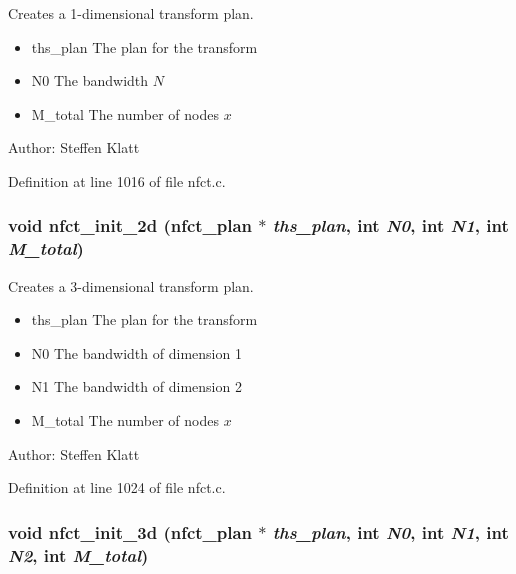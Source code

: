 Creates a 1-dimensional transform plan. 

\begin{itemize}
\item ths\_\-plan The plan for the transform \item N0 The bandwidth $N$ \item M\_\-total The number of nodes $x$\end{itemize}
\begin{Desc}
\item[Author:]Steffen Klatt \end{Desc}


Definition at line 1016 of file nfct.c.\hypertarget{group__nfsct_g84c8a611ea11546b90a7db424ebced7c}{
\subsubsection{\setlength{\rightskip}{0pt plus 5cm}void nfct\_\-init\_\-2d ({\bf nfct\_\-plan} $\ast$ {\em ths\_\-plan}, int {\em N0}, int {\em N1}, int {\em M\_\-total})}}
\label{group__nfsct_g84c8a611ea11546b90a7db424ebced7c}


Creates a 3-dimensional transform plan. 

\begin{itemize}
\item ths\_\-plan The plan for the transform \item N0 The bandwidth of dimension 1 \item N1 The bandwidth of dimension 2 \item M\_\-total The number of nodes $x$\end{itemize}
\begin{Desc}
\item[Author:]Steffen Klatt \end{Desc}


Definition at line 1024 of file nfct.c.\hypertarget{group__nfsct_g7894f72320bda7850ccf43b9a227fe09}{
\subsubsection{\setlength{\rightskip}{0pt plus 5cm}void nfct\_\-init\_\-3d ({\bf nfct\_\-plan} $\ast$ {\em ths\_\-plan}, int {\em N0}, int {\em N1}, int {\em N2}, int {\em M\_\-total})}}
\label{group__nfsct_g7894f72320bda7850ccf43b9a227fe09}


